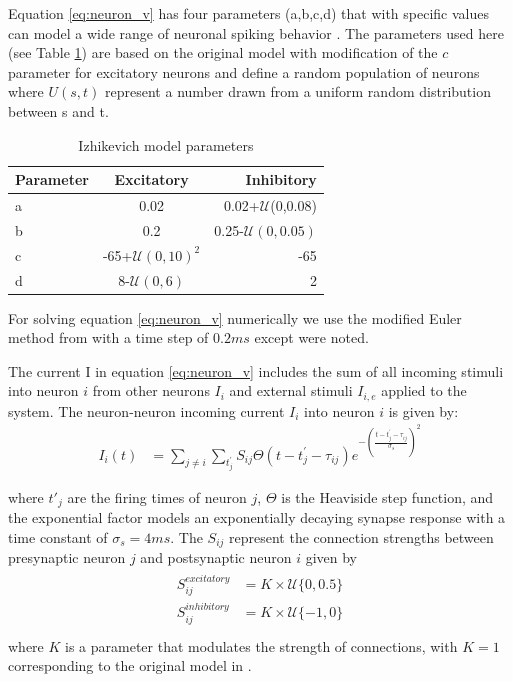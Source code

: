 \documentclass[12pt]{article}
\begin{document}
Equation \ref{eq:neuron_v} has four parameters (a,b,c,d) that with specific values can model a wide range of neuronal spiking behavior \parencite{izhikevich2003}. 
The parameters used here (see Table \ref{tab:izzy_params}) are based on the original model with modification of the $c$ parameter for excitatory neurons and define a random population of neurons where $U(s,t)$ represent a number drawn from a uniform random distribution between s and t. 
\begin{table}[!htb]
 \caption{Izhikevich model parameters}
 \label{tab:izzy_params}
 \centering
 \begin{tabular}{lcr}
  \textbf{Parameter} & \textbf{Excitatory} & \textbf{Inhibitory} \\
  \hline
  a & 0.02 & 0.02+$\mathcal{U}$(0,0.08) \\
  b & 0.2 & 0.25-$\mathcal{U}(0,0.05)$\\
  c & -65+$\mathcal{U}(0,10)^2$ & -65 \\
  d & 8-$\mathcal{U}(0,6)$& 2 \\
 \end{tabular}
\end{table}
For solving equation \ref{eq:neuron_v} numerically we use the modified Euler method from \parencite{izhikevich2003} with a time step of $0.2 ms$ except were noted. 

The current I in equation \ref{eq:neuron_v} includes the sum of all incoming stimuli into neuron $i$ from other neurons $I_i$ and external stimuli $I_{i,e}$ applied to the system. 
The neuron-neuron incoming current $I_i$ into neuron $i$ is given by:
\begin{align}
 I_i(t) &= \sum_{j\ne i} \sum_{t^\prime_j} S_{ij}  \Theta(t-t^\prime_j-\tau_{ij})e^{-(\frac{t-t^\prime_j-\tau_{ij}}{\sigma_s})^2}
\end{align}

where $t'_j$ are the firing times of neuron $j$, $\Theta$ is the Heaviside step function, and the exponential factor models an exponentially decaying synapse response with a time constant of $\sigma_s = 4 ms$. 
The $S_{ij}$ represent the connection strengths between presynaptic neuron $j$ and postsynaptic neuron $i$ given by
\begin{align}
 \begin{split}
  S_{ij}^{excitatory} &= K \times \mathcal{U}\{0,0.5 \} \\
  S_{ij}^{inhibitory} &= K \times \mathcal{U}\{-1,0 \}  \\
 \end{split}
\end{align}
where $K$ is a parameter that modulates the strength of connections, with $K=1$ corresponding to the original model in \parencite{izhikevich2003}. 
\end{document}
